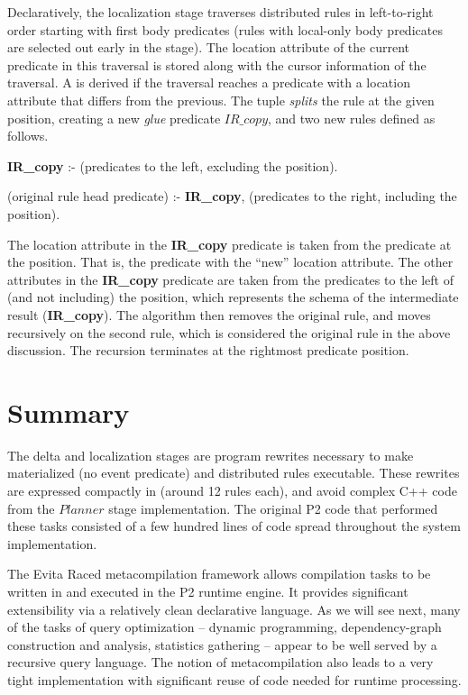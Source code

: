 Declaratively, the localization stage traverses distributed rules in
left-to-right order starting with first body predicates (rules with local-only
body predicates are selected out early in the stage).  The location attribute
of the current predicate in this traversal is stored along with the cursor
information of the traversal.  A  is derived if the traversal
reaches a predicate with a location attribute that differs from the previous.
The  tuple {\em splits} the rule at the given position, creating
a new {\em glue} predicate $IR\_copy$, and two new rules defined as follows.
\begin{CompactEnumerate} 
\item {\bf IR\_copy} :- (predicates to the left, excluding the  position).  
\item (original rule head predicate) :- {\bf IR\_copy}, (predicates to the right, including
  the  position).  
\end{CompactEnumerate} 
The location attribute in the {\bf IR\_copy} predicate is taken from the
predicate at the  position.  That is, the predicate with the
``new'' location attribute.  The other attributes in the {\bf IR\_copy}
predicate are taken from the predicates to the left of (and not including) the
 position, which represents the schema of the intermediate result
({\bf IR\_copy}).  The algorithm then removes the original rule, and moves
recursively on the second rule, which is considered the original rule in the
above discussion.  The recursion terminates at the rightmost predicate
position.

\section{Summary} 
\label{ch:evita:sec:summary} 

The delta and localization stages are program rewrites necessary to make
materialized (no event predicate) and distributed rules executable.  These
rewrites are expressed compactly in \OVERLOG (around 12 rules each), and
avoid complex C++ code from the $Planner$ stage implementation.  The original
P2 code that performed these tasks consisted of a few hundred lines of code
spread throughout the system implementation.

The Evita Raced metacompilation framework allows \OVERLOG compilation tasks to
be written in \OVERLOG and executed in the P2 runtime engine.  It provides
significant extensibility via a relatively clean declarative language.  As we
will see next, many of the tasks of query optimization -- dynamic programming,
dependency-graph construction and analysis, statistics gathering -- appear to
be well served by a recursive query language.  The notion of metacompilation
also leads to a very tight implementation with significant reuse of code needed
for runtime processing.



